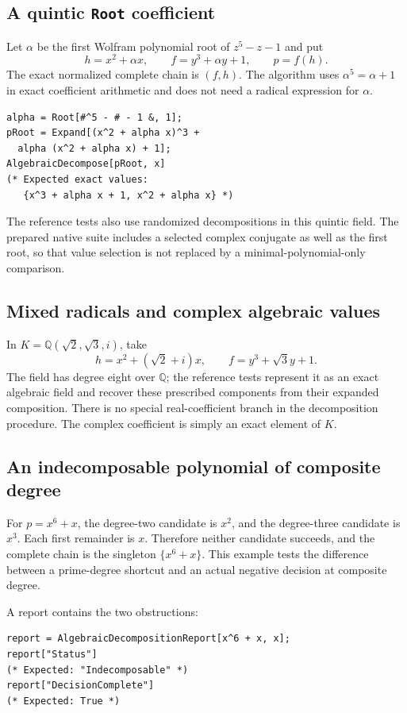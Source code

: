 \documentclass[11pt,letterpaper]{article}
\theoremstyle{definition}
\theoremstyle{remark}
\newcommand{\Q}{\mathbb Q}
\begin{document}
\subsection{A quintic \texttt{Root} coefficient}
Let $\alpha$ be the first Wolfram polynomial root of $z^5-z-1$ and put
\[
 h=x^2+\alpha x,\qquad f=y^3+\alpha y+1,
 \qquad p=f(h).
\]
The exact normalized complete chain is $(f,h)$. The algorithm uses
$\alpha^5=\alpha+1$ in exact coefficient arithmetic and does not need a
radical expression for $\alpha$.
\begin{lstlisting}
alpha = Root[#^5 - # - 1 &, 1];
pRoot = Expand[(x^2 + alpha x)^3 +
  alpha (x^2 + alpha x) + 1];
AlgebraicDecompose[pRoot, x]
(* Expected exact values:
   {x^3 + alpha x + 1, x^2 + alpha x} *)
\end{lstlisting}
The reference tests also use randomized decompositions in this quintic
field. The prepared native suite includes a selected complex conjugate
as well as the first root, so that value selection is not replaced by a
minimal-polynomial-only comparison.

\subsection{Mixed radicals and complex algebraic values}
In $K=\Q(\sqrt2,\sqrt3,i)$, take
\[
 h=x^2+(\sqrt2+i)x,\qquad f=y^3+\sqrt3 y+1.
\]
The field has degree eight over $\Q$; the reference tests represent it
as an exact algebraic field and recover these prescribed components from
their expanded composition. There is no special real-coefficient branch
in the decomposition procedure. The complex coefficient is simply an
exact element of $K$.

\subsection{An indecomposable polynomial of composite degree}
For $p=x^6+x$, the degree-two candidate is $x^2$, and the degree-three
candidate is $x^3$. Each first remainder is $x$. Therefore neither
candidate succeeds, and the complete chain is the singleton $\{x^6+x\}$.
This example tests the difference between a prime-degree shortcut and an
actual negative decision at composite degree.

A report contains the two obstructions:
\begin{lstlisting}
report = AlgebraicDecompositionReport[x^6 + x, x];
report["Status"]
(* Expected: "Indecomposable" *)
report["DecisionComplete"]
(* Expected: True *)
\end{lstlisting}
\end{document}
